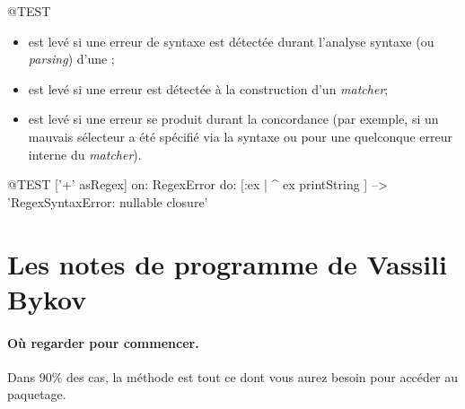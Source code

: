 \documentclass[a4paper,10pt,twoside]{book}
\begin{document}
\begin{code}{@TEST}
\begin{itemize}
\item {} est levé si une erreur de syntaxe est
  détectée durant l'analyse syntaxe (ou \emph{parsing}) d'une \expreg;
\item {} est levé si une erreur est
  détectée à la construction d'un \emph{matcher};
\item {} est levé si une erreur se produit
  durant la concordance (par exemple, si un mauvais sélecteur a été
  spécifié via la syntaxe  ou pour une quelconque
  erreur interne du \emph{matcher}).



\end{itemize}


\begin{code}{@TEST}
['+' asRegex] on: RegexError do: [:ex | ^ ex printString ]                                        --> 'RegexSyntaxError:  nullable closure'
\end{code}
\section{Les notes de programme de Vassili Bykov}

\paragraph{Où regarder pour commencer.}
Dans 90\% des cas, la méthode  est tout
ce dont vous aurez besoin pour accéder au paquetage.


\end{code}
\end{document}
